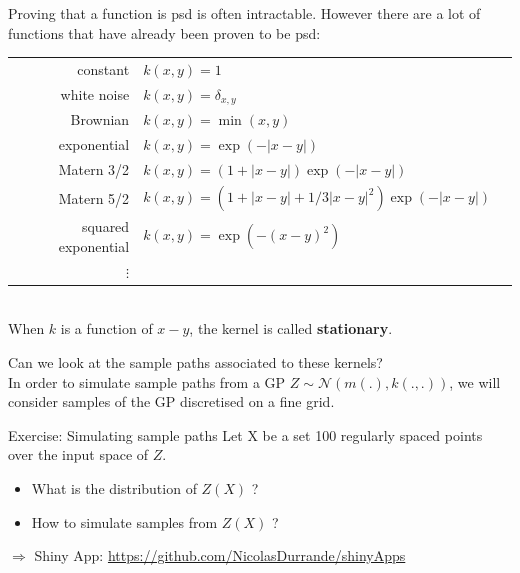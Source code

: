 \begin{frame}{}
Proving that a function is psd is often intractable. However there are a lot of functions that have already been proven to be psd:\\
\vspace{2mm}
\footnotesize
\begin{tabular}{rlN}
		constant & $ \displaystyle k(x,y) = 1 $ &\\[4mm]
		white noise & $ \displaystyle k(x,y) = \delta_{x,y} $ &\\[4mm]
		Brownian & $ \displaystyle k(x,y) =  \min (x,y) $ &\\[4mm]
		exponential & $\displaystyle k(x,y) = \exp \left(- |x-y| \right)$ &\\[4mm]
		Matern 3/2 & $\displaystyle k(x,y) = \left(1 + |x-y| \right) \exp \left(- |x-y| \right)$ &\\[4mm]
		Matern 5/2 & $\displaystyle k(x,y) = \left(1 + |x-y| + 1/3|x-y|^2 \right) \exp \left(- |x-y| \right)$ &\\[4mm]
		squared exponential & $\displaystyle k(x,y) = \exp \left(- (x-y)^2 \right)$ &\\[4mm]
		$\vdots$ &
\end{tabular}\\
\vspace{2mm}
\normalsize
When $k$ is a function of $x-y$, the kernel is called \textbf{stationary}.
\end{frame}

\begin{frame}{}
Can we look at the sample paths associated to these kernels?\\
\vspace{5mm}
In order to simulate sample paths from a GP $Z \sim \mathcal{N}(m(.),k(.,.))$, we will consider samples of the GP discretised on a fine grid.
\vspace{5mm}
\begin{exampleblock}{Exercise: Simulating sample paths}
Let X be a set 100 regularly spaced points over the input space of $Z$.
\begin{itemize}
	\item What is the distribution of $Z(X)$ ?
	\item How to simulate samples from $Z(X)$ ?
\end{itemize}
\end{exampleblock}
\vspace{5mm}
$\Rightarrow$ Shiny App: \url{https://github.com/NicolasDurrande/shinyApps}
\end{frame}

